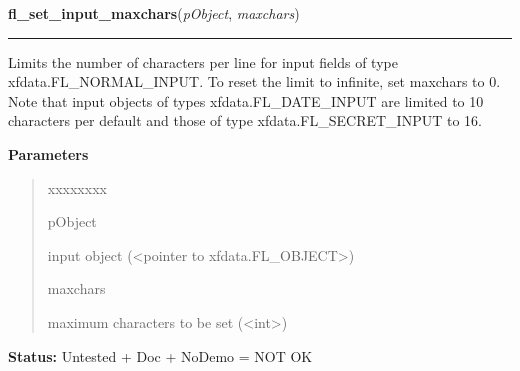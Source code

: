 \hspace{.8\funcindent}\begin{boxedminipage}{\funcwidth}

    \raggedright \textbf{fl\_set\_input\_maxchars}(\textit{pObject}, \textit{maxchars})

    \vspace{-1.5ex}

    \rule{\textwidth}{0.5\fboxrule}
\setlength{\parskip}{2ex}
    Limits the number of characters per line for input fields of type 
    xfdata.FL\_NORMAL\_INPUT. To reset the limit to infinite, set maxchars 
    to 0. Note that input objects of types xfdata.FL\_DATE\_INPUT are 
    limited to 10 characters per default and those of type 
    xfdata.FL\_SECRET\_INPUT to 16.

\setlength{\parskip}{1ex}
      \textbf{Parameters}
      \vspace{-1ex}

      \begin{quote}
        \begin{Ventry}{xxxxxxxx}

          \item[pObject]

          input object ({\textless}pointer to 
          xfdata.FL\_OBJECT{\textgreater})

          \item[maxchars]

          maximum characters to be set ({\textless}int{\textgreater})

        \end{Ventry}

      \end{quote}

\textbf{Status:} Untested + Doc + NoDemo = NOT OK



    \end{boxedminipage}

    \label{xformslib:library:fl_set_input_format}

    \vspace{0.5ex}

